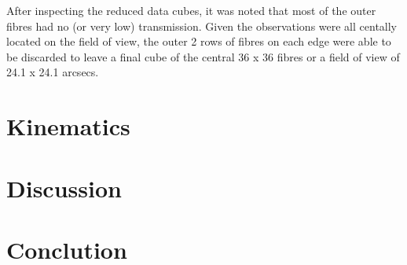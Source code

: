 \documentclass[a4paper,11pt]{article}
\begin{document}
		After inspecting the reduced data cubes, it was noted that most of the outer fibres had no (or very low) transmission. Given the observations were all centally located on the field of view, the outer 2 rows of fibres on each edge were able to be discarded to leave a final cube of the central 36 x 36 fibres or a field of view of 24.1 x 24.1 arcsecs. 
\section{Kinematics}
	\label{sec:kine}

\section{Discussion}
	\label{sec:discuss}

\section{Conclution}
	\label{sec:conc}



%

%
\end{document}
